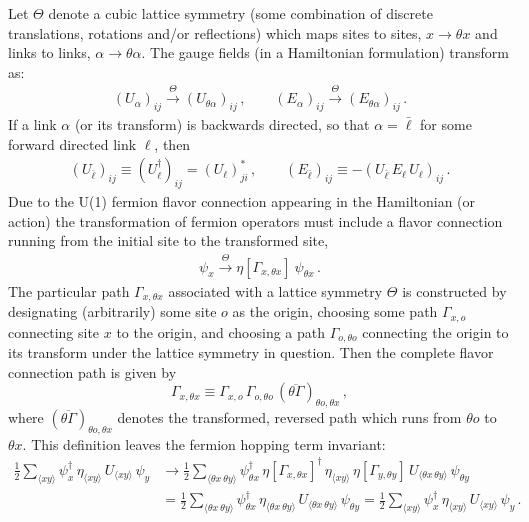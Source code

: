 \documentclass [12pt]{article}
\begin{document}
Let $\Theta$ denote a cubic lattice symmetry
(some combination of discrete translations, rotations and/or reflections)
which maps sites to sites, $x \to \theta x$
and links to links, $\alpha \to \theta \alpha$.
The gauge fields (in a Hamiltonian formulation)
transform as:
\begin{align}
    (U_\alpha)_{ij} \xrightarrow{\Theta} (U_{\theta \alpha})_{ij} \,,
\qquad
    (E_\alpha)_{ij} \xrightarrow{\Theta} (E_{\theta \alpha})_{ij} \,.
\label{eq:thetagauge}
\end{align}
If a link $\alpha$ (or its transform) is backwards directed, so that $\alpha = \bar\ell$
for some forward directed link $\ell$, then
\begin{align}
    (U_{\bar\ell})_{ij} \equiv (U_\ell^\dagger)_{ij} = (U_\ell)_{ji}^* \,,
\qquad
    (E_{\bar\ell})_{ij} \equiv -(U_{\bar\ell} \, E_\ell \, U_\ell)_{ij} \,.
\end{align}
Due to the U(1) fermion flavor connection
appearing in the Hamiltonian (or action)
the transformation of fermion operators must include
a flavor connection running from the initial site to the transformed site,
\begin{align}
    \psi_x \xrightarrow{\Theta}
    \eta[\Gamma_{x,\theta x}] \> \psi_{\theta x} \,.
\label{eq:thetafermi}
\end{align}
The particular path $\Gamma_{x,\theta x}$ associated
with a lattice symmetry $\Theta$ is constructed by designating
(arbitrarily) some site $o$ as the origin,
choosing some path $\Gamma_{x,o}$ connecting site $x$ to the origin,
and choosing a path
$\Gamma_{o,\theta o}$ connecting the origin to its transform
under the lattice symmetry in question.
Then the complete flavor connection path is given by
\begin{equation}
    \Gamma_{x,\theta x} \equiv
    \Gamma_{x,o} \, \Gamma_{o,\theta o} \, (\overline{\theta\Gamma})_{\theta o,\theta x} \,,
\end{equation}
where $(\overline{\theta \Gamma})_{\theta o,\theta x}$ denotes the transformed, reversed
path which runs from $\theta o$ to $\theta x$.
This definition leaves the fermion hopping term invariant:
\begin{align}
    \tfrac 12 \sum_{\langle xy \rangle}
	\psi_x^\dagger \,
	\eta_{\langle xy \rangle} \,
	U_{\langle xy \rangle} \,
	\psi_y
    &\to
    \tfrac 12 \sum_{\langle \theta x \> \theta y \rangle}
	\psi_{\theta x}^\dagger \,
	\eta[\Gamma_{x,\theta x}]^\dagger \,
	\eta_{\langle xy \rangle} \,
	\eta[\Gamma_{y,\theta y}] \,
	U_{\langle \theta x \, \theta y \rangle} \,
	\psi_{\theta y}
    \nonumber\\ &=
    \tfrac 12 \sum_{\langle \theta x \> \theta y \rangle}
	\psi_{\theta x}^\dagger \,
	\eta_{\langle \theta x \> \theta y \rangle} \,
	U_{\langle \theta x \> \theta y \rangle} \, \psi_{\theta y}
    =
    \tfrac 12 \sum_{\langle xy \rangle}
	\psi_x^\dagger \,
	\eta_{\langle xy \rangle} \,
	U_{\langle xy \rangle} \,
	\psi_y \,.
\end{align}
\end{document}
